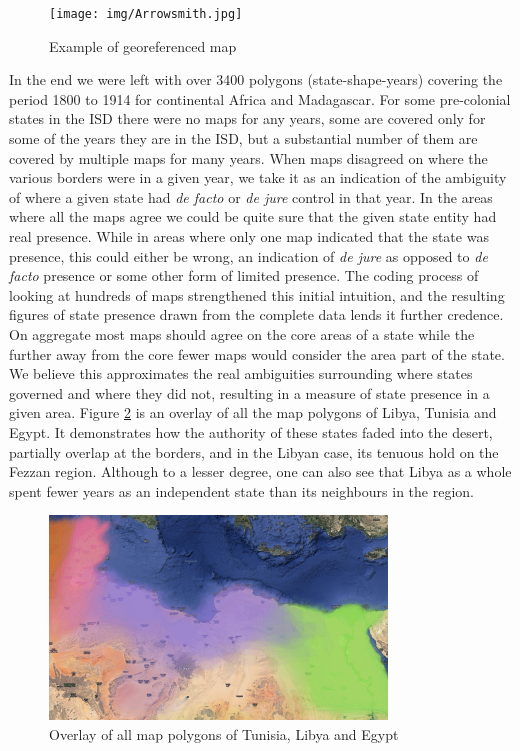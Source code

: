 \documentclass[12pt]{article}
\begin{document}

\begin{figure}[h!tpb]
	\centering
	\texttt{[image: img/Arrowsmith.jpg]}
	\caption{Example of georeferenced map}%
	\label{fig:Arrowsmith}
\end{figure}


In the end we were left with over 3400 polygons (state-shape-years) covering the
period 1800 to 1914 for continental Africa and Madagascar. For some pre-colonial
states in the ISD there were no maps for any years, some are covered only for
some of the years they are in the ISD, but a substantial number of them are
covered by multiple maps for many years. When maps disagreed on where the
various borders were in a given year, we take it as an indication of the
ambiguity of where a given state had \emph{de facto} or \emph{de jure} control
in that year. In the areas where all the maps agree we could be quite sure that
the given state entity had real presence.  While in areas where only one map
indicated that the state was presence, this could either be wrong, an indication
of \emph{de jure} as opposed to \emph{de facto} presence or some other form of
limited presence. The coding process of looking at hundreds of maps strengthened
this initial intuition, and the resulting figures of state presence drawn from
the complete data lends it further credence. On aggregate most maps should agree
on the core areas of a state while the further away from the core fewer maps
would consider the area part of the state. We believe this approximates the real
ambiguities surrounding where states governed and where they did not, resulting
in a measure of state presence in a given area. Figure \ref{overlay} is an
overlay of all the map polygons of Libya, Tunisia and Egypt. It demonstrates how
the authority of these states faded into the desert, partially overlap at the
borders, and in the Libyan case, its tenuous hold on the Fezzan region. Although
to a lesser degree, one can also see that Libya as a whole spent fewer years as
an independent state than its neighbours in the region.


\begin{figure}[htpb]
	\centering
	\includegraphics[width=0.8\textwidth,keepaspectratio]{../TUNLIBEGY.pdf}
	\caption{Overlay of all map polygons of Tunisia, Libya and Egypt}
	\label{overlay}
\end{figure}
\end{document}
